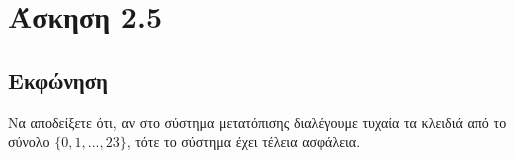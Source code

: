 \section{Άσκηση 2.5}

\subsection{Εκφώνηση}

Να αποδείξετε ότι, αν στο σύστημα μετατόπισης διαλέγουμε τυχαία τα κλειδιά από το σύνολο $\{0, 1, ..., 23\}$, τότε το σύστημα έχει τέλεια ασφάλεια.